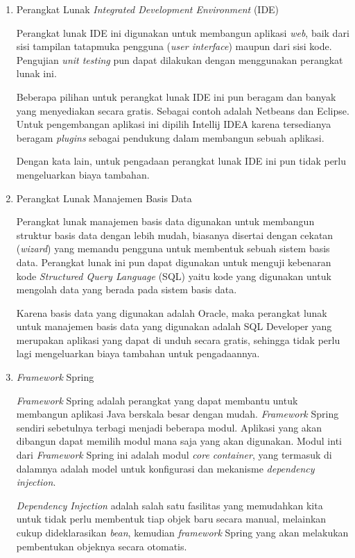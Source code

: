 \documentclass[pdftex,12pt, oneside]{article}
\begin{document}
\begin{enumerate}
	\item Perangkat Lunak \textit{Integrated Development Environment} (IDE)
	
Perangkat lunak IDE ini digunakan untuk membangun aplikasi \textit{web}, baik dari sisi tampilan tatapmuka pengguna (\textit{user interface}) maupun dari sisi kode. Pengujian \textit{unit testing} pun dapat dilakukan dengan menggunakan perangkat lunak ini.

Beberapa pilihan untuk perangkat lunak IDE ini pun beragam dan banyak yang menyediakan secara gratis. Sebagai contoh adalah Netbeans dan Eclipse. Untuk pengembangan aplikasi ini dipilih Intellij IDEA karena tersedianya beragam \textit{plugins} sebagai pendukung dalam membangun sebuah aplikasi. 

Dengan kata lain, untuk pengadaan perangkat lunak IDE ini pun tidak perlu mengeluarkan biaya tambahan.
	
	\item Perangkat Lunak Manajemen Basis Data
	
Perangkat lunak manajemen basis data digunakan untuk membangun struktur basis data dengan lebih mudah, biasanya disertai dengan cekatan (\textit{wizard}) yang memandu pengguna untuk membentuk sebuah sistem basis data. Perangkat lunak ini pun dapat digunakan untuk menguji kebenaran kode \textit{Structured Query Language} (SQL) yaitu kode yang digunakan untuk mengolah data yang berada pada sistem basis data.

Karena basis data yang digunakan adalah Oracle, maka perangkat lunak untuk manajemen basis data yang digunakan adalah SQL Developer yang merupakan aplikasi yang dapat di unduh secara gratis, sehingga tidak perlu lagi mengeluarkan biaya tambahan untuk pengadaannya.
	
	\item \textit{Framework} Spring
	
\textit{Framework} Spring adalah perangkat yang dapat membantu untuk membangun aplikasi Java berskala besar dengan mudah. \textit{Framework} Spring sendiri sebetulnya terbagi menjadi beberapa modul. Aplikasi yang akan dibangun dapat memilih modul mana saja yang akan digunakan. Modul inti dari \textit{Framework} Spring ini adalah modul \textit{core container}, yang termasuk di dalamnya adalah model untuk konfigurasi dan mekanisme \textit{dependency injection}.

\textit{Dependency Injection} adalah salah satu fasilitas yang memudahkan kita untuk tidak perlu membentuk tiap objek baru secara manual, melainkan cukup dideklarasikan \textit{bean}, kemudian \textit{framework} Spring yang akan melakukan pembentukan objeknya secara otomatis.


\end{enumerate}
\end{document}

